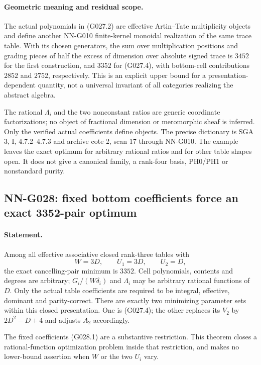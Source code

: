 \paragraph{Geometric meaning and residual scope.}
The actual polynomials in (G027.2) are effective
Artin--Tate multiplicity objects and define another
NN-G010 finite-kernel monoidal realization of the
same trace table. With its chosen generators, the
sum over multiplication positions and grading pieces
of half the excess of dimension over absolute signed
trace is $3452$ for the first construction, and $3352$
for (G027.4), with bottom-cell contributions $2852$
and $2752$, respectively.
This is an explicit upper bound for a presentation-dependent
quantity, not a universal invariant of all categories
realizing the abstract algebra.

The rational $\Lambda_i$ and the two nonconstant ratios
are generic coordinate factorizations; no object of
fractional dimension or meromorphic sheaf is inferred.
Only the verified actual coefficients define objects.
The precise dictionary is SGA 3, I, 4.7.2--4.7.3 and
archive cote 2, scan 17 through NN-G010. The example
leaves the exact optimum for arbitrary rational ratios
and for other table shapes open. It does not give a
canonical family, a rank-four basis, PH0/PH1 or
nonstandard purity.

\subsection{NN-G028: fixed bottom coefficients force an exact 3352-pair optimum}
\paragraph{Statement.}
Among all effective associative closed rank-three tables with
\[
 W=3D,\qquad U_1=3D,\qquad U_2=D,                    \tag{G028.1}
\]
the exact cancelling-pair minimum is $3352$.
Cell polynomials, contents and degrees are arbitrary;
$G_i/(W\delta_i)$ and $\Lambda_i$ may be arbitrary
rational functions of $D$. Only the actual table
coefficients are required to be integral, effective,
dominant and parity-correct. There are exactly two
minimizing parameter sets within this closed presentation.
One is (G027.4); the other replaces its $V_2$ by
$2D^2-D+4$ and adjusts $A_2$ accordingly.

The fixed coefficients (G028.1) are a substantive
restriction. This theorem closes a rational-function
optimization problem inside that restriction, and
makes no lower-bound assertion when $W$ or the two
$U_i$ vary.

